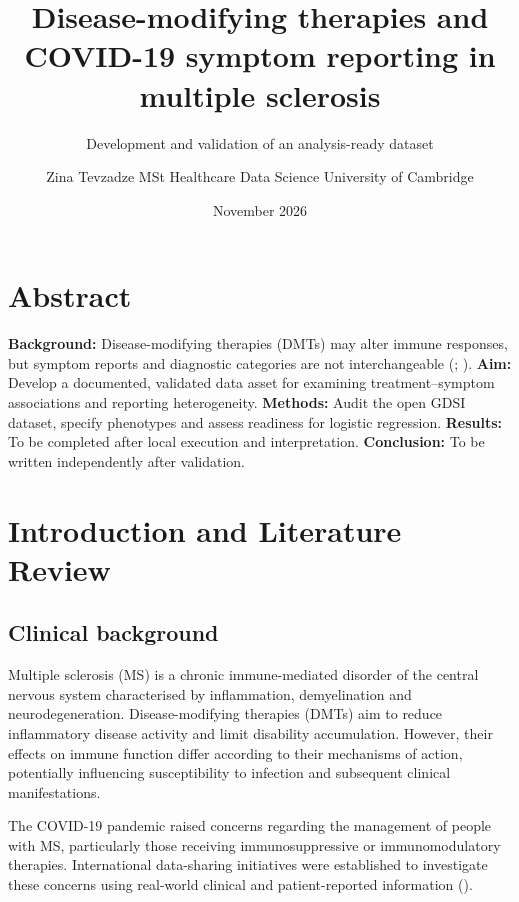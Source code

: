\documentclass[
  british,
]{article}
\title{Disease-modifying therapies and COVID-19 symptom reporting in
multiple sclerosis}
\subtitle{Development and validation of an analysis-ready dataset}
\author{Zina Tevzadze \textbar{} MSt Healthcare Data Science \textbar{}
University of Cambridge}
\date{November 2026}
\begin{document}
\maketitle

{
\setcounter{tocdepth}{2}
\tableofcontents
}
\section*{Abstract}\label{abstract}

\textbf{Background:} Disease-modifying therapies (DMTs) may alter immune
responses, but symptom reports and diagnostic categories are not
interchangeable (;
). \textbf{Aim:} Develop
a documented, validated data asset for examining treatment--symptom
associations and reporting heterogeneity. \textbf{Methods:} Audit the
open GDSI dataset, specify phenotypes and assess readiness for logistic
regression. \textbf{Results:} To be completed after local execution and
interpretation. \textbf{Conclusion:} To be written independently after
validation.

\section{Introduction and Literature
Review}\label{introduction-and-literature-review}

\subsection{Clinical background}\label{clinical-background}

Multiple sclerosis (MS) is a chronic immune-mediated disorder of the
central nervous system characterised by inflammation, demyelination and
neurodegeneration. Disease-modifying therapies (DMTs) aim to reduce
inflammatory disease activity and limit disability accumulation.
However, their effects on immune function differ according to their
mechanisms of action, potentially influencing susceptibility to
infection and subsequent clinical manifestations.

The COVID-19 pandemic raised concerns regarding the management of people
with MS, particularly those receiving immunosuppressive or
immunomodulatory therapies. International data-sharing initiatives were
established to investigate these concerns using real-world clinical and
patient-reported information ().
\end{document}
